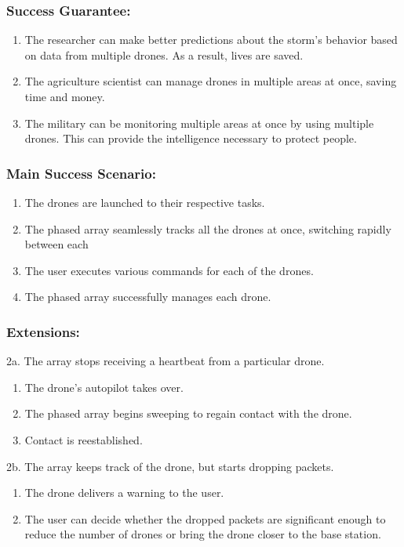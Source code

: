 \documentclass[ProductRequirements.tex]{subfiles}
\begin{document}
	\subsubsection*{Success Guarantee:}
	\begin{enumerate}
		\item The researcher can make better predictions about the storm's behavior based on data from multiple drones. As a result, lives are saved.
		\item The agriculture scientist can manage drones in multiple areas at once, saving time and money.
		\item The military can be monitoring multiple areas at once by using multiple drones. This can provide the intelligence necessary to protect people.
	\end{enumerate}
	\subsubsection*{Main Success Scenario:}
	\begin{enumerate}\itemsep1pt
		\item The drones are launched to their respective tasks.
		\item The phased array seamlessly tracks all the drones at once, switching rapidly between each
		\item The user executes various commands for each of the drones.
		\item The phased array successfully manages each drone.
	\end{enumerate}
	\subsubsection*{Extensions:}
		2a. The array stops receiving a heartbeat from a particular drone.
		\begin{enumerate}
			\item The drone's autopilot takes over.
			\item The phased array begins sweeping to regain contact with the drone.
			\item Contact is reestablished.
		\end{enumerate}
		2b. The array keeps track of the drone, but starts dropping packets.
		\begin{enumerate}
			\item The drone delivers a warning to the user.
			\item The user can decide whether the dropped packets are significant enough to reduce the number of drones or bring the drone closer to the base station.
		\end{enumerate}
\end{document}
